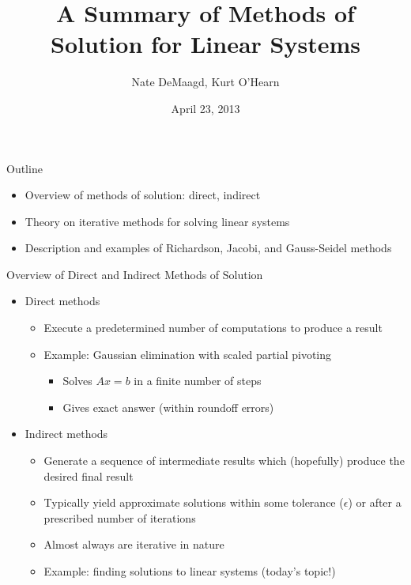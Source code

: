 \documentclass[9pt, serif]{beamer}
\title[Methods of Solution for Linear Systems]
{A Summary of Methods of Solution for Linear Systems}
\author[]
{Nate DeMaagd, Kurt O'Hearn}
\institute[Grand Valley State University]
{MTH 499-02}
\date{April 23, 2013}
\newlength{\wideitemsep}
\let\olditem\item
\renewcommand{\item}{\setlength{\itemsep}{\wideitemsep}\olditem}
\newcommand{\bi}{\begin{itemize}}
\newcommand{\ei}{\end{itemize}}
\begin{document}
\begin{frame}
    \titlepage
\end{frame}


\begin{frame}{Outline}
    \pause
    \bi
        \item Overview of methods of solution: direct, indirect \pause
        \item Theory on iterative methods for solving linear systems \pause
        \item Description and examples of Richardson, Jacobi, and Gauss-Seidel methods
    \ei
\end{frame}


\begin{frame}{Overview of Direct and Indirect Methods of Solution}
    \pause
    \bi
        \item Direct methods \pause
        \bi
            \item Execute a predetermined number of computations to produce a result \pause
            \item Example: Gaussian elimination with scaled partial pivoting \pause
    	    \bi
	            \item Solves $Ax=b$ in a finite number of steps \pause
        	    \item Gives exact answer (within roundoff errors) \pause
    	    \ei
        \ei
        \item Indirect methods \pause
        \bi
            \item Generate a sequence of intermediate results which (hopefully) produce the desired final result \pause
	        \item Typically yield approximate solutions within some tolerance ($\epsilon$) or after a prescribed number of iterations \pause
	        \item Almost always are iterative in nature \pause
	        \item Example: finding solutions to linear systems (today's topic!)
	    \ei
    \ei
\end{frame}
\end{document}

